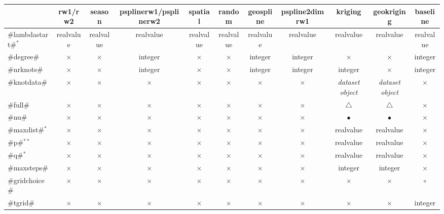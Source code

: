 \begin{table} \footnotesize
\begin{tabular}{|l||c|c|c|c|c|c|c|c|c|c|}

\hline
            & rw1/rw2       & season    & psplinerw1/psplinerw2    & spatial & random & geospline & pspline2dimrw1 & kriging  & geokriging & baseline\\
 \hline\hline
 #lambdastart#$^*$  & realvalue   & realvalue   & realvalue   & realvalue   & realvalue   & realvalue   & realvalue & realvalue  & realvalue & realvalue\\
 \hline
 #degree#       & $\times$   & $\times$   &  integer   & $\times$ & $\times$ &  integer &  integer &  $\times$ & $\times$ & integer\\
 \hline
 #nrknots#      & $\times$   & $\times$   &  integer   & $\times$ & $\times$ &  integer &  integer &  integer & $\times$ & integer\\
 \hline
 #knotdata#     & $\times$   & $\times$   &  $\times$   & $\times$ & $\times$ &  $\times$ &  $\times$ & {\em dataset object}& {\em dataset object} & $\times$\\
 \hline
 #full#     & $\times$   & $\times$   &  $\times$   & $\times$ & $\times$ &  $\times$ &  $\times$ &  $\triangle$ & $\triangle$ & $\times$\\
 \hline
 #nu#     & $\times$   & $\times$   &  $\times$   & $\times$ & $\times$ &  $\times$ &  $\times$ &  $\bullet$ &  $\bullet$ & $\times$\\
 \hline
 #maxdist#$^*$     & $\times$   & $\times$   &  $\times$   & $\times$ & $\times$ &  $\times$ &  $\times$ &  realvalue &  realvalue &  $\times$\\
 \hline
 #p#$^{**}$     & $\times$   & $\times$   &  $\times$   & $\times$ & $\times$ &  $\times$ &  $\times$ &  realvalue &  realvalue &  $\times$\\
 \hline
 #q#$^*$     & $\times$   & $\times$   &  $\times$   & $\times$ & $\times$ &  $\times$ &  $\times$ &  realvalue &  realvalue &  $\times$\\
 \hline
 #maxsteps#     & $\times$   & $\times$   &  $\times$   & $\times$ & $\times$ &  $\times$ &  $\times$ &  integer  &  integer & $\times$\\
 \hline
 #gridchoice#   & $\times$  & $\times$  & $\times$  & $\times$  & $\times$  & $\times$  & $\times$  & $\times$  & $\times$ & $\circ$\\
 \hline
 #tgrid#   & $\times$  & $\times$  & $\times$  & $\times$  & $\times$  & $\times$  & $\times$  & $\times$  & $\times$ & integer\\

\end{tabular}
\end{table}
